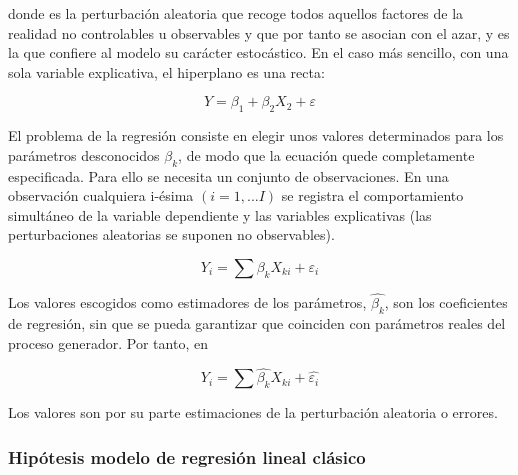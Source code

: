 \documentclass{article}
\begin{document}
donde \varepsilon  es la perturbación aleatoria que recoge todos
aquellos factores de la realidad no controlables u observables y que por
tanto se asocian con el azar, y es la que confiere al modelo su carácter
estocástico. En el caso más sencillo, con una sola variable explicativa,
el hiperplano es una recta:

\begin{equation}
Y = \beta_1 + \beta_2 X_2 + \varepsilon
\end{equation}

El problema de la regresión consiste en elegir unos valores determinados
para los parámetros desconocidos $\beta_k$, de modo que la ecuación
quede completamente especificada. Para ello se necesita un conjunto de
observaciones. En una observación cualquiera i-ésima $(i= 1,... I)$ se
registra el comportamiento simultáneo de la variable dependiente y las
variables explicativas (las perturbaciones aleatorias se suponen no
observables).

\begin{equation}
Y_i = \sum \beta_k X_{ki} + \varepsilon_i
\end{equation}

Los valores escogidos como estimadores de los parámetros,
$\hat{\beta_k}$, son los coeficientes de regresión, sin que se pueda
garantizar que coinciden con parámetros reales del proceso generador.
Por tanto, en

\begin{equation}
Y_i = \sum \hat{\beta_k} X_{ki} + \hat{\varepsilon_i}
\end{equation}

Los valores  son por su parte estimaciones de la
perturbación aleatoria o errores.

\subsubsection{Hipótesis modelo de regresión lineal
clásico}\label{hipuxf3tesis-modelo-de-regresiuxf3n-lineal-cluxe1sico}
\end{document}
